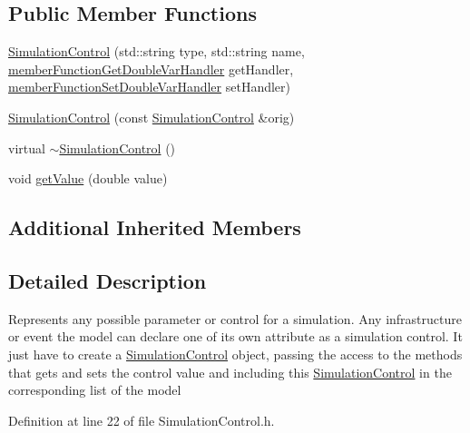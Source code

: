 \subsection*{Public Member Functions}
\begin{DoxyCompactItemize}
\item 
\hyperlink{class_simulation_control_ac267bc01748eed55f8f10ceb6dcd705c}{Simulation\-Control} (std\-::string type, std\-::string name, \hyperlink{_listener_8h_aa97195a0d80442c68665a1267e6ea97b}{member\-Function\-Get\-Double\-Var\-Handler} get\-Handler, \hyperlink{_listener_8h_a82a7292bfc6ddeaf96ebc9f3e2389467}{member\-Function\-Set\-Double\-Var\-Handler} set\-Handler)
\item 
\hyperlink{class_simulation_control_a12851e6e9168d46c2a9761ac52b6b49c}{Simulation\-Control} (const \hyperlink{class_simulation_control}{Simulation\-Control} \&orig)
\item 
virtual \hyperlink{class_simulation_control_ae6e46cf7af75d2d6755bcb99ac1a6b23}{$\sim$\-Simulation\-Control} ()
\item 
void \hyperlink{class_simulation_control_ac46ad05e94e936b335f67457819f1ff5}{get\-Value} (double value)
\end{DoxyCompactItemize}
\subsection*{Additional Inherited Members}


\subsection{Detailed Description}
Represents any possible parameter or control for a simulation. Any infrastructure or event the model can declare one of its own attribute as a simulation control. It just have to create a \hyperlink{class_simulation_control}{Simulation\-Control} object, passing the access to the methods that gets and sets the control value and including this \hyperlink{class_simulation_control}{Simulation\-Control} in the corresponding list of the model 

Definition at line 22 of file Simulation\-Control.\-h.




